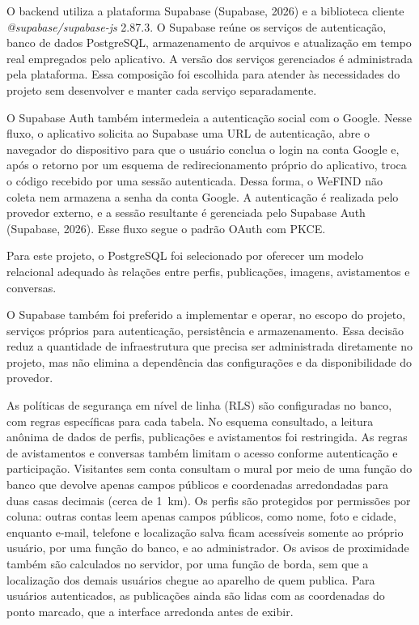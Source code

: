 O backend utiliza a plataforma Supabase (Supabase, 2026) e a biblioteca cliente \textit{@supabase/supabase-js} 2.87.3. O Supabase reúne os serviços de autenticação, banco de dados PostgreSQL, armazenamento de arquivos e atualização em tempo real empregados pelo aplicativo. A versão dos serviços gerenciados é administrada pela plataforma. Essa composição foi escolhida para atender às necessidades do projeto sem desenvolver e manter cada serviço separadamente.

O Supabase Auth também intermedeia a autenticação social com o Google. Nesse fluxo, o aplicativo solicita ao Supabase uma URL de autenticação, abre o navegador do dispositivo para que o usuário conclua o login na conta Google e, após o retorno por um esquema de redirecionamento próprio do aplicativo, troca o código recebido por uma sessão autenticada. Dessa forma, o WeFIND não coleta nem armazena a senha da conta Google. A autenticação é realizada pelo provedor externo, e a sessão resultante é gerenciada pelo Supabase Auth (Supabase, 2026). Esse fluxo segue o padrão OAuth com PKCE.

Para este projeto, o PostgreSQL foi selecionado por oferecer um modelo relacional adequado às relações entre perfis, publicações, imagens, avistamentos e conversas.

O Supabase também foi preferido a implementar e operar, no escopo do projeto, serviços próprios para autenticação, persistência e armazenamento. Essa decisão reduz a quantidade de infraestrutura que precisa ser administrada diretamente no projeto, mas não elimina a dependência das configurações e da disponibilidade do provedor.

As políticas de segurança em nível de linha (RLS) são configuradas no banco, com regras específicas para cada tabela. No esquema consultado, a leitura anônima de dados de perfis, publicações e avistamentos foi restringida. As regras de avistamentos e conversas também limitam o acesso conforme autenticação e participação. Visitantes sem conta consultam o mural por meio de uma função do banco que devolve apenas campos públicos e coordenadas arredondadas para duas casas decimais (cerca de 1~km). Os perfis são protegidos por permissões por coluna: outras contas leem apenas campos públicos, como nome, foto e cidade, enquanto e-mail, telefone e localização salva ficam acessíveis somente ao próprio usuário, por uma função do banco, e ao administrador. Os avisos de proximidade também são calculados no servidor, por uma função de borda, sem que a localização dos demais usuários chegue ao aparelho de quem publica. Para usuários autenticados, as publicações ainda são lidas com as coordenadas do ponto marcado, que a interface arredonda antes de exibir.

